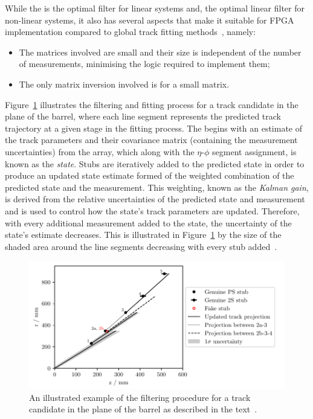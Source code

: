 While the \KF is the optimal filter for linear systems and, the optimal linear filter for non-linear systems, it also has several aspects that make it suitable for FPGA implementation compared to global track fitting methods~\cite{Fruhwirth:1987fm}, namely:

\begin{itemize}
\item {The matrices involved are small and their size is independent of the number of measurements, minimising the logic required to implement them;}
\item {The only matrix inversion involved is for a small matrix.}
\end{itemize}


Figure~\ref{fig:KF} illustrates the \KF filtering and fitting process for a track candidate in the \rz plane of the barrel, where each line segment represents the predicted track trajectory at a given stage in the fitting process.
The \KF begins with an estimate of the track parameters and their covariance matrix (containing the measurement uncertainties) from the \HT array, which along with the $\eta$-$\phi$ segment assignment, is known as the \emph{state}.
Stubs are iteratively added to the predicted state in order to produce an updated state estimate formed of the weighted combination of the predicted state and the measurement.
This weighting, known as the \emph{Kalman gain}, is derived from the relative uncertainties of the predicted state and measurement and is used to control how the state's track parameters are updated.
Therefore, with every additional measurement added to the state, the uncertainty of the state's estimate decreases.
This is illustrated in Figure~\ref{fig:KF} by the size of the shaded area around the line segments decreasing with every stub added~\cite{TMTT_JINST}.

\begin{figure}[!h]
\centering
\includegraphics[width=\textwidth]{figs/tk-upgrade/kf_states.pdf}
\caption{An illustrated example of the \KF filtering procedure for a track candidate in the \rz plane of the barrel as described in the text~\cite{TMTT_JINST}.
}
\label{fig:KF}
\end{figure}


